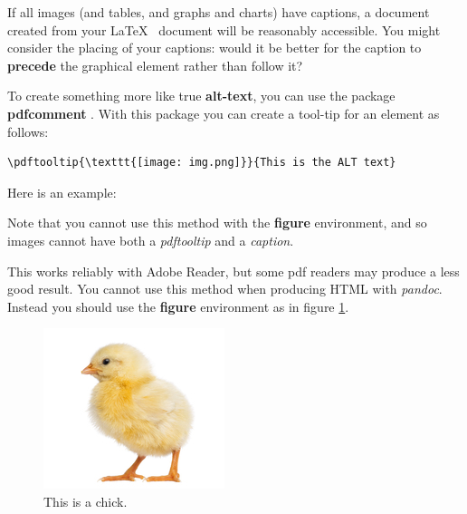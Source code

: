 \documentclass[]{article}
\begin{document}
If all images (and tables, and graphs and charts) have captions, a
document created from your \LaTeX~ document will be reasonably
accessible. You might consider the placing of your captions: would it be
better for the caption to \textbf{precede} the graphical element rather
than follow it?

To create something more like true \textbf{alt-text}, you can use the
package \textbf{pdfcomment} \citep{pdfcomment}. With this package you can create a tool-tip
for an element as follows:

\begin{verbatim}
\pdftooltip{\texttt{[image: img.png]}}{This is the ALT text}
\end{verbatim}

Here is an example:


Note that you cannot use this method with the \textbf{figure} environment, and so
images cannot have both a \emph{pdftooltip} and a \emph{caption}.

This works reliably with Adobe Reader, but some pdf readers may produce
a less good result.  You cannot use this method when producing HTML with \emph{pandoc}.
Instead you should use the \textbf{figure} environment as in figure \ref{chick}.

\begin{figure}

\includegraphics{chick.jpg}
\caption{This is a chick.}
\label{chick}
\end{figure}
\end{document}
